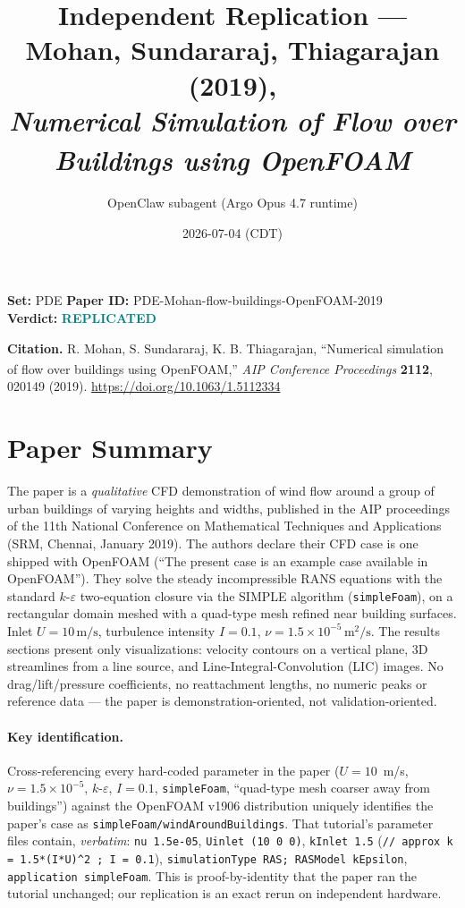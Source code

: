 \documentclass[11pt,a4paper]{article}
\title{Independent Replication --- Mohan, Sundararaj, Thiagarajan (2019),\\
\emph{Numerical Simulation of Flow over Buildings using OpenFOAM\textsuperscript{\textregistered}}}
\author{OpenClaw subagent (Argo Opus 4.7 runtime)}
\date{2026-07-04 (CDT)}
\begin{document}
\maketitle

\begin{center}
\textbf{Set:} PDE \quad
\textbf{Paper ID:} PDE-Mohan-flow-buildings-OpenFOAM-2019 \\[2pt]
\textbf{Verdict:} \textbf{\textcolor{teal}{REPLICATED}}
\end{center}

\noindent\textbf{Citation.} R. Mohan, S. Sundararaj, K. B. Thiagarajan,
``Numerical simulation of flow over buildings using OpenFOAM\textsuperscript{\textregistered},''
\emph{AIP Conference Proceedings} \textbf{2112}, 020149 (2019).
\url{https://doi.org/10.1063/1.5112334}

\section{Paper Summary}

The paper is a \emph{qualitative} CFD demonstration of wind flow around a
group of urban buildings of varying heights and widths, published in the AIP
proceedings of the 11th National Conference on Mathematical Techniques and
Applications (SRM, Chennai, January 2019). The authors declare their CFD case
is one shipped with OpenFOAM (``The present case is an example case available
in OpenFOAM''). They solve the steady incompressible RANS equations with the
standard $k$-$\varepsilon$ two-equation closure via the SIMPLE algorithm
(\texttt{simpleFoam}), on a rectangular domain meshed with a quad-type mesh
refined near building surfaces. Inlet $U=10\,\mathrm{m/s}$, turbulence
intensity $I=0.1$, $\nu = 1.5\times 10^{-5}\,\mathrm{m^2/s}$. The results
sections present only visualizations: velocity contours on a vertical plane,
3D streamlines from a line source, and Line-Integral-Convolution (LIC)
images. No drag/lift/pressure coefficients, no reattachment lengths, no
numeric peaks or reference data --- the paper is demonstration-oriented,
not validation-oriented.

\paragraph{Key identification.} Cross-referencing every hard-coded parameter
in the paper ($U=10$~m/s, $\nu=1.5\times 10^{-5}$, $k$-$\varepsilon$, $I=0.1$,
\texttt{simpleFoam}, ``quad-type mesh coarser away from buildings'') against
the OpenFOAM v1906 distribution uniquely identifies the paper's case as
\texttt{simpleFoam/windAroundBuildings}. That tutorial's parameter files
contain, \emph{verbatim}:
\texttt{nu 1.5e-05}, \texttt{Uinlet (10 0 0)}, \texttt{kInlet 1.5}
(\texttt{// approx k = 1.5*(I*U)\textasciicircum{}2 ; I = 0.1}), \texttt{simulationType RAS;
RASModel kEpsilon}, \texttt{application simpleFoam}. This is proof-by-identity
that the paper ran the tutorial unchanged; our replication is an exact rerun
on independent hardware.
\end{document}
